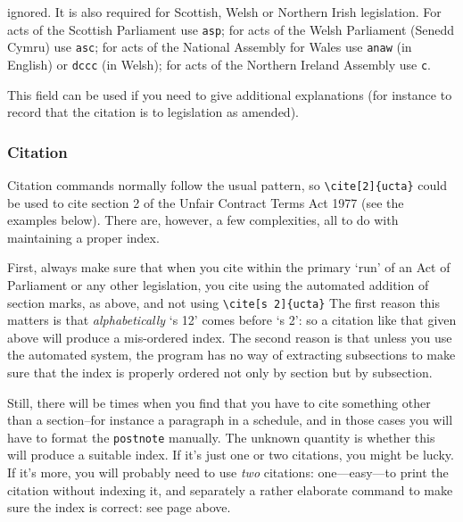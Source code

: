 \documentclass[a4paper,
               11pt,
	       DIV=1,			   
	       footinclude=false]
	      {scrartcl}
\begin{document}
\begin{description}
  ignored. It is also required for Scottish, Welsh or Northern Irish
  legislation. For acts of the Scottish Parliament use \texttt{asp};
  for acts of the Welsh Parliament (Senedd Cymru) use \texttt{asc};
  for acts of the National Assembly for Wales use \texttt{anaw} (in
  English) or \texttt{dccc} (in Welsh); for acts of the Northern
  Ireland Assembly use \texttt{c}.
\item[note]
This field can be used if you need to give additional
  explanations (for instance to record that the citation is to
  legislation as amended).
\end{description}

\subsubsection{Citation}

Citation commands normally follow the usual pattern, so
\verb|\cite[2]{ucta}| could be used to cite section 2 of the Unfair
Contract Terms Act 1977 (see the examples below). There are, however,
a few complexities, all to do with maintaining a proper index.

First, always make sure that when you cite within the primary `run' of
an Act of Parliament or any other legislation, you cite using the automated addition of section
marks, as above, and not using \verb|\cite[s 2]{ucta}| The first reason
this matters is that \emph{alphabetically} `s 12' comes before `s
2': so a citation like that given above will produce a mis-ordered
index. The second reason is that unless you use the automated system,
the program has no way of extracting subsections to make sure that the
index is properly ordered not only by section but by subsection.

Still, there will be times when you find that you have to cite
something other than a section--for instance a paragraph in a
schedule, and in those cases you will have to format the
\texttt{postnote} manually. The unknown quantity is whether this will
produce a suitable index. If it's just one or two citations, you might
be lucky. If it's more, you will probably need to use \emph{two}
citations: one---easy---to print the citation without indexing it, and
separately a rather elaborate command to make sure the index is correct: see page \pageref{trickyindexing} above.
\end{document}
